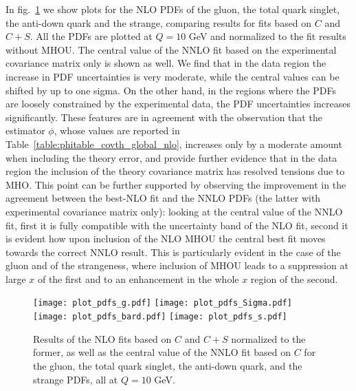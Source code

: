     In fig.~\ref{fig:pdfs_plots_th_err} we show plots for the NLO PDFs of the gluon, the total quark singlet,
    the anti-down quark and the strange, comparing results for fits based on $C$ and $C+S$.
    All the PDFs are plotted at $Q=10$ GeV and normalized to the fit results without MHOU.
    The central value of the NNLO fit based on the experimental covariance matrix only is shown as well.
    We find that in the data region the increase in PDF uncertainties is very moderate, while the central values 
    can be shifted by up to one sigma. On the other hand, in the regions where the PDFs are loosely constrained by the experimental
    data, the PDF uncertainties increases significantly.
    These features are in agreement with the observation that the estimator $\phi$, whose values are reported 
    in Table~\ref{table:phitable_covth_global_nlo}, increases only by a moderate amount when including the theory error,
    and provide further evidence that in the data region the inclusion of the theory covariance matrix has resolved tensions
    due to MHO.
    This point can be further supported by observing the improvement in the agreement between the best-NLO fit and the NNLO PDFs
    (the latter with experimental covariance matrix only): looking at the central value of the NNLO fit, 
    first it is fully compatible with the uncertainty band of the NLO fit, second it is evident how upon inclusion of 
    the NLO MHOU the central best fit moves towards the correct NNLO result.
    This is particularly evident in the case of the gluon and of the strangeness, where inclusion of MHOU leads to a
    suppression at large $x$ of the first and to an enhancement in the whole $x$ region of the second.  
    \begin{figure}[t!]
        \begin{center}
            \texttt{[image: plot\_pdfs\_g.pdf]}
            \texttt{[image: plot\_pdfs\_Sigma.pdf]}
            \texttt{[image: plot\_pdfs\_bard.pdf]}
            \texttt{[image: plot\_pdfs\_s.pdf]}
            \caption{Results of the NLO fits based on $C$ and $C + S$ normalized to the
            former, as well as the central value of the NNLO fit based on $C$ for the gluon, the total quark singlet, 
            the anti-down quark, and the strange PDFs, all at $Q = 10$ GeV.} 
            \label{fig:pdfs_plots_th_err} 
        \end{center}
    \end{figure}

